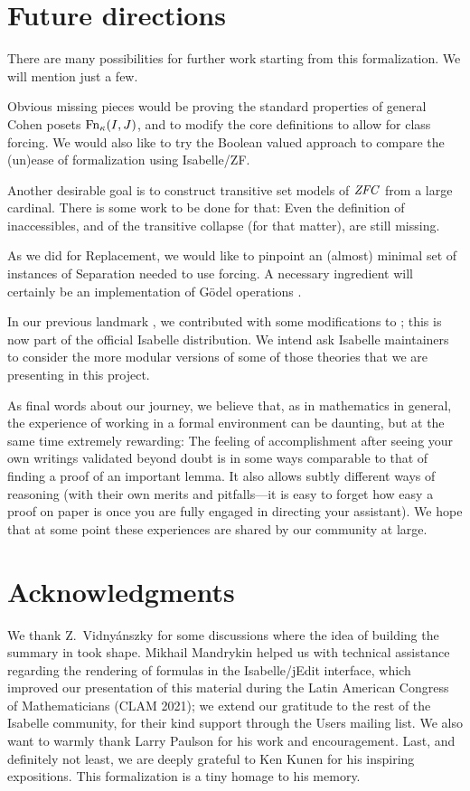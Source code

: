 \section{Future directions}
\label{sec:conclusion}

There are many possibilities for further work starting from this
formalization. We will mention just a few.

Obvious missing pieces would be proving the standard properties of
general Cohen posets $\operatorname{Fn}_\kappa(I,J)$, and to modify the core
definitions to allow for class forcing. We would also like to try the
Boolean valued approach to compare the (un)ease of formalization using
Isabelle/ZF.

Another desirable goal is to construct transitive set models of $\mathit{ZFC}$
from a large cardinal. There is some work to be done for that: Even the
definition of inaccessibles, and of the transitive collapse (for that
matter), are still missing.

As we did for Replacement, we would like to pinpoint an (almost)
minimal set of instances of
Separation needed to use forcing. A necessary ingredient will
certainly be an implementation of Gödel operations
\cite[Thm.~13.4]{Jech_Millennium}.

In our previous landmark \cite{2020arXiv200109715G}, we contributed
with some modifications to ; this is now
part of the official Isabelle distribution.  We intend ask Isabelle
maintainers to consider the more modular versions of some of those
theories that we are presenting in this project.

As final words about our journey, we believe that, as in mathematics
in general, the experience of working in a formal environment can be
daunting, but at the same time extremely rewarding: The feeling of
accomplishment after seeing your own writings validated beyond doubt is
in some ways comparable to that of finding a proof of an important
lemma. It also allows subtly different ways of reasoning (with their
own merits and pitfalls---it is easy to forget how easy a proof on
paper is once you are fully engaged in directing your assistant). We
hope that at some point these experiences are shared by our community
at large.


\section*{Acknowledgments}
\label{sec:acknowledgments}
We thank Z.~Vidnyánszky for some discussions where the idea of
building the summary in  took shape.
Mikhail Mandrykin helped us with technical assistance regarding the
rendering of formulas in the Isabelle/jEdit interface, which improved
our presentation of this material during the Latin American Congress
of Mathematicians (CLAM 2021); we extend our gratitude to the rest of
the Isabelle community, for their kind support through the Users mailing
list. We also want to warmly thank Larry Paulson for his work and
encouragement.  Last, and definitely not least, we are deeply grateful
to Ken Kunen for his
inspiring expositions. This formalization is a tiny homage to his
memory.


